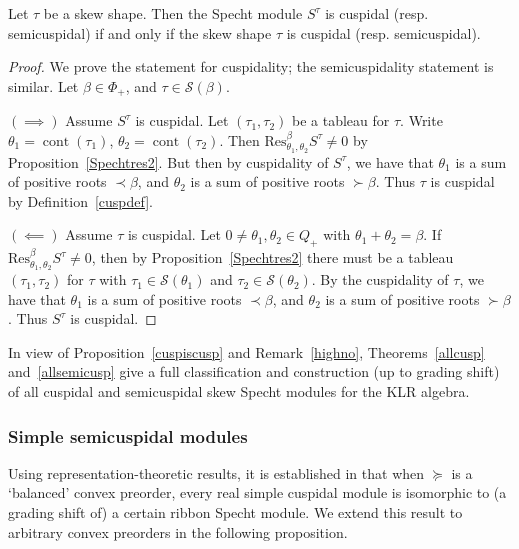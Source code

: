 \documentclass[Unicode,ALCO]{cedram}
\newcommand{\SSSS}{\mathcal{S}}
\newcommand{\0}{{\bar 0}}
\newcommand{\Res}{{\mathrm {Res}}}
\def\cont{{\operatorname{cont}}}
\begin{document}
\begin{prop}\label{cuspiscusp}
Let \(\tau\) be a skew shape. Then the Specht module \(S^\tau\) is cuspidal (resp. semicuspidal) if and only if the skew shape \(\tau\) is cuspidal (resp. semicuspidal).
\end{prop}
\begin{proof}
We prove the statement for cuspidality; the semicuspidality statement is similar.
Let \(\beta \in \Phi_+\), and \(\tau \in \SSSS(\beta)\). 

\((\implies)\) Assume \(S^\tau\) is cuspidal. Let \((\tau_1, \tau_2)\) be a tableau for \(\tau\). Write \(\theta_1 = \cont(\tau_1)\), \(\theta_2 = \cont(\tau_2)\). Then \(\Res_{\theta_1, \theta_2}^\beta S^\tau \neq 0\) by Proposition~\ref{Spechtres2}. But then by cuspidality of \(S^\tau\), we have that \(\theta_1\) is a sum of positive roots \(\prec \beta\), and \(\theta_2\) is a sum of positive roots \(\succ \beta\). Thus \(\tau\) is cuspidal by Definition~\ref{cuspdef}.

\((\impliedby)\) Assume \(\tau\) is cuspidal. Let \(0 \neq \theta_1, \theta_2 \in Q_+\) with \(\theta_1 + \theta_2 =  \beta\). If \(\Res_{\theta_1, \theta_2}^\beta S^\tau \neq 0\), then by Proposition~\ref{Spechtres2} there must be a tableau \((\tau_1, \tau_2)\) for \(\tau\) with \(\tau_1 \in \SSSS(\theta_1)\) and \(\tau_2 \in \SSSS(\theta_2)\). By the cuspidality of \(\tau\), we have that \(\theta_1\) is a sum of positive roots \(\prec \beta\), and \(\theta_2\) is a sum of positive roots \(\succ \beta\). Thus \(S^\tau\) is cuspidal.
\end{proof}

In view of Proposition~\ref{cuspiscusp} and Remark~\ref{highno}, Theorems~\ref{allcusp} and~\ref{allsemicusp} give a full classification and construction (up to grading shift) of all cuspidal and semicuspidal skew Specht modules for the KLR algebra. 

\subsubsection{Simple semicuspidal modules}
Using representation-theoretic results, it is established in \cite[Proposition 8.5]{MuSkew} that when \(\succeq\) is a `balanced' convex preorder, every real simple cuspidal module is isomorphic to (a grading shift of) a certain ribbon Specht module. We extend this result to arbitrary convex preorders in the following proposition.
\end{document}
